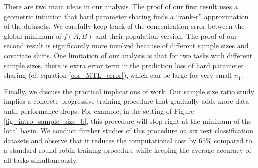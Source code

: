



There are two main ideas in our analysis. The proof of our first result uses a geometric intuition that hard parameter sharing finds a ``rank-$r$'' approximation of the datasets.
We carefully keep track of the concentration error between the global minimum of $f(A, B)$ and their population version.
The proof of our second result is significantly more involved because of different sample sizes and covariate shifts.
One limitation of our analysis is that for two tasks with different sample sizes, there is extra error term in the prediction loss of hard parameter sharing (cf. equation \eqref{cor_MTL_error}), which can be large for very small $n_1$.

Finally, we discuss the practical implications of work.
Our sample size ratio study implies a concrete progressive training procedure that gradually adds more data until performance drops.
For example, in the setting of Figure \ref{fig_intro_sample_size_b}, this procedure will stop right at the minimum of the local basin.
We conduct further studies of this procedure on six text classification datasets and observe that it reduces the computational cost by $65\%$ compared to a standard round-robin training procedure while keeping the average accuracy of all tasks simultaneously.

